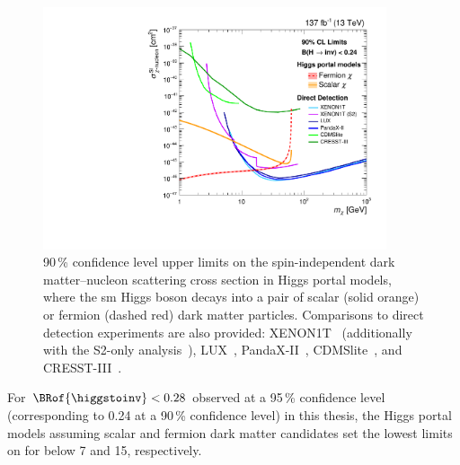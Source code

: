 \begin{figure}
    \centering
    \includegraphics[width=0.9\textwidth]{figures/dark_matter_limit/higgsPortalDM.pdf}
    \caption[90\,\% confidence level upper limits on the spin-independent dark matter--nucleon scattering cross section in Higgs portal models, where the standard model Higgs boson decays into a pair of scalar (solid orange) or fermion (dashed red) dark matter particles]{90\,\% confidence level upper limits on the spin-independent dark matter--nucleon scattering cross section in Higgs portal models, where the \acrlong{sm} Higgs boson decays into a pair of scalar (solid orange) or fermion (dashed red) dark matter particles. Comparisons to direct detection experiments are also provided: XENON1T~\cite{Aprile:2018dbl} (additionally with the S2-only analysis~\cite{Aprile:2019xxb}), LUX~\cite{Akerib:2016vxi}, PandaX-II~\cite{Cui:2017nnn}, CDMSlite~\cite{Agnese:2018gze}, and CRESST-III~\cite{Abdelhameed:2019hmk}.}
    \label{fig:higgs_portal_dm_limits}
\end{figure}

For $\BRof{\higgstoinv} < \text{0.28}$ observed at a 95\,\% confidence level (corresponding to 0.24 at a 90\,\% confidence level) in this thesis, the Higgs portal models assuming scalar and fermion dark matter candidates set the lowest limits on \xsecSI for \mqdark below 7 and 15\GeV, respectively.
